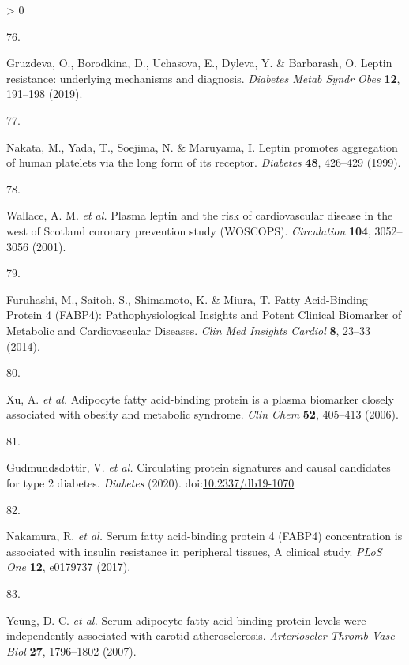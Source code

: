 \documentclass[11pt,twoside]{bristolthesis}
\newlength{\cslhangindent}
\newlength{\csllabelwidth}
\newenvironment{CSLReferences}[2] %
 {%
  \setlength{\parindent}{0pt}
  \ifodd #1 \everypar{\setlength{\hangindent}{\cslhangindent}}\ignorespaces\fi
  \ifnum #2 > 0
  \setlength{\parskip}{#2\baselineskip}
  \fi
 }%
 {}
\newcommand{\CSLLeftMargin}[1]{\parbox[t]{\csllabelwidth}{#1}}
\newcommand{\CSLRightInline}[1]{\parbox[t]{\linewidth - \csllabelwidth}{#1}\break}
\begin{document}
\begin{CSLReferences}{0}{0}
\leavevmode\hypertarget{ref-Gruzdeva2019a}{}%
\CSLLeftMargin{76. }
\CSLRightInline{Gruzdeva, O., Borodkina, D., Uchasova, E., Dyleva, Y. \& Barbarash, O. {Leptin resistance: underlying mechanisms and diagnosis}. \emph{Diabetes Metab Syndr Obes} \textbf{12}, 191--198 (2019).}

\leavevmode\hypertarget{ref-Nakata1999}{}%
\CSLLeftMargin{77. }
\CSLRightInline{Nakata, M., Yada, T., Soejima, N. \& Maruyama, I. {Leptin promotes aggregation of human platelets via the long form of its receptor}. \emph{Diabetes} \textbf{48}, 426--429 (1999).}

\leavevmode\hypertarget{ref-Wallace2001}{}%
\CSLLeftMargin{78. }
\CSLRightInline{Wallace, A. M. \emph{et al.} {Plasma leptin and the risk of cardiovascular disease in the west of Scotland coronary prevention study (WOSCOPS)}. \emph{Circulation} \textbf{104}, 3052--3056 (2001).}

\leavevmode\hypertarget{ref-Furuhashi2014}{}%
\CSLLeftMargin{79. }
\CSLRightInline{Furuhashi, M., Saitoh, S., Shimamoto, K. \& Miura, T. {Fatty Acid-Binding Protein 4 (FABP4): Pathophysiological Insights and Potent Clinical Biomarker of Metabolic and Cardiovascular Diseases}. \emph{Clin Med Insights Cardiol} \textbf{8}, 23--33 (2014).}

\leavevmode\hypertarget{ref-Xu2006}{}%
\CSLLeftMargin{80. }
\CSLRightInline{Xu, A. \emph{et al.} {Adipocyte fatty acid-binding protein is a plasma biomarker closely associated with obesity and metabolic syndrome}. \emph{Clin Chem} \textbf{52}, 405--413 (2006).}

\leavevmode\hypertarget{ref-Gudmundsdottir2020}{}%
\CSLLeftMargin{81. }
\CSLRightInline{Gudmundsdottir, V. \emph{et al.} {Circulating protein signatures and causal candidates for type 2 diabetes}. \emph{Diabetes} (2020). doi:\href{https://doi.org/10.2337/db19-1070}{10.2337/db19-1070}}

\leavevmode\hypertarget{ref-Nakamura2017}{}%
\CSLLeftMargin{82. }
\CSLRightInline{Nakamura, R. \emph{et al.} {Serum fatty acid-binding protein 4 (FABP4) concentration is associated with insulin resistance in peripheral tissues, A clinical study}. \emph{PLoS One} \textbf{12}, e0179737 (2017).}

\leavevmode\hypertarget{ref-Yeung2007}{}%
\CSLLeftMargin{83. }
\CSLRightInline{Yeung, D. C. \emph{et al.} {Serum adipocyte fatty acid-binding protein levels were independently associated with carotid atherosclerosis}. \emph{Arterioscler Thromb Vasc Biol} \textbf{27}, 1796--1802 (2007).}


\end{CSLReferences}
\end{document}
